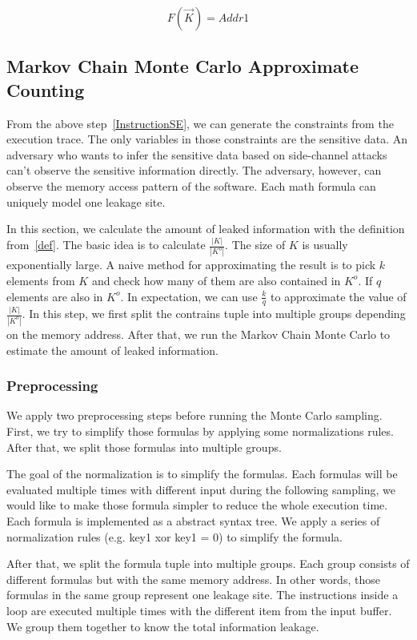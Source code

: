 $$F(\vec{K}) = Addr1$$

\subsection{Markov Chain Monte Carlo Approximate Counting}

From the above step~\ref{InstructionSE}, we can generate the constraints 
from the execution trace. 
The only variables in those constraints are the sensitive data. An adversary who 
wants to infer the sensitive data based on side-channel attacks can't observe 
the sensitive information directly. The adversary, however, can observe the
memory access pattern of the software. Each math formula can uniquely model
one leakage site.

In this section, we calculate the amount of leaked information with the
definition from~\ref{def}. The basic idea is to calculate $\frac{|K|}{|K^o|}$.
The size of $K$ is usually exponentially large. A naive method for approximating
the result is to pick $k$ elements from $K$ and check how many of them are also
contained in $K^o$. If $q$ elements are also in $K^o$. In expectation, we can
use $\frac{k}{q}$ to approximate the value of $\frac{|K|}{|K^o|}$. In this step,
we first split the contrains tuple into multiple groups depending on the memory
address. After that, we run the Markov Chain Monte Carlo to estimate the amount
of leaked information.


\subsubsection{Preprocessing}
We apply two preprocessing steps before running the Monte Carlo sampling. First,
we try to simplify those formulas by applying some normalizations rules. After
that, we split those formulas into multiple groups.

The goal of the normalization is to simplify the formulas. 
Each formulas will be evaluated multiple times with different input 
during the following sampling, 
we would like to make those formula simpler to reduce the whole execution time.  
Each formula is implemented as a abstract syntax tree. We apply a series of 
normalization rules (e.g. key1 xor key1 = 0) to simplify the formula.

After that, we split the formula tuple into multiple groups. 
Each group consists of different formulas but with the same memory address.
In other words, those formulas in the same group represent one leakage
site. The instructions inside a loop are executed multiple times with
the different item from the input buffer. We group them together to 
know the total information leakage.

